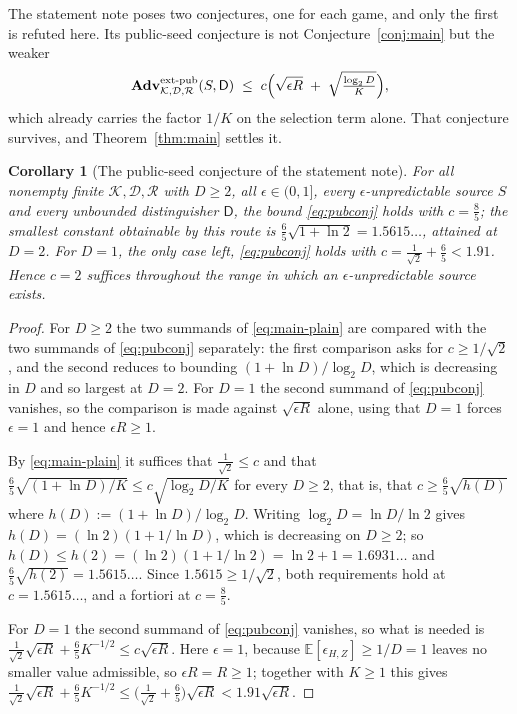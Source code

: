 \documentclass[11pt,a4paper]{article}
\theoremstyle{plain}
\newtheorem{corollary}[theorem]{Corollary}
\theoremstyle{definition}
\theoremstyle{remark}
\newcommand{\Adv}{\mathbf{Adv}}
\newcommand{\extp}{\mathrm{ext}\text{-}\mathrm{pub}}
\newcommand{\calK}{\mathcal{K}}
\newcommand{\calD}{\mathcal{D}}
\newcommand{\calR}{\mathcal{R}}
\begin{document}
The statement note poses two conjectures, one for each game, and only the first is refuted here.
Its public-seed conjecture is not Conjecture~\ref{conj:main} but the weaker
\begin{equation}\label{eq:pubconj}
  \Adv^{\extp}_{\calK,\calD,\calR}(S,\mathsf{D})
  \;\le\; c\Bigl(\sqrt{\epsilon R} \;+\; \sqrt{\tfrac{\log_2 D}{K}}\Bigr) ,
\end{equation}
which already carries the factor $1/K$ on the selection term alone. That conjecture survives, and
Theorem~\ref{thm:main} settles it.

\begin{corollary}[The public-seed conjecture of the statement note]\label{cor:pub}
For all nonempty finite $\calK, \calD, \calR$ with $D \ge 2$, all $\epsilon \in (0,1]$, every
$\epsilon$-unpredictable source $S$ and every unbounded distinguisher $\mathsf{D}$, the bound
\eqref{eq:pubconj} holds with $c = \tfrac85$; the smallest constant obtainable by this route is
$\tfrac65\sqrt{1 + \ln 2} = 1.5615\ldots$, attained at $D = 2$. For $D = 1$, the only case left,
\eqref{eq:pubconj} holds with $c = \tfrac{1}{\sqrt2} + \tfrac65 < 1.91$. Hence $c = 2$ suffices
throughout the range in which an $\epsilon$-unpredictable source exists.
\end{corollary}

\begin{proof}
For $D \ge 2$ the two summands of \eqref{eq:main-plain} are compared with the two summands of
\eqref{eq:pubconj} separately: the first comparison asks for $c \ge 1/\sqrt2$, and the second
reduces to bounding $(1+\ln D)/\log_2 D$, which is decreasing in $D$ and so largest at $D = 2$.
For $D = 1$ the second summand of \eqref{eq:pubconj} vanishes, so the comparison is made against
$\sqrt{\epsilon R}$ alone, using that $D = 1$ forces $\epsilon = 1$ and hence $\epsilon R \ge 1$.

By \eqref{eq:main-plain} it suffices that $\tfrac{1}{\sqrt2} \le c$ and that
$\tfrac65\sqrt{(1+\ln D)/K} \le c\sqrt{\log_2 D / K}$ for every $D \ge 2$, that is, that
$c \ge \tfrac65\sqrt{h(D)}$ where $h(D) := (1+\ln D)/\log_2 D$. Writing
$\log_2 D = \ln D/\ln 2$ gives $h(D) = (\ln 2)(1 + 1/\ln D)$, which is decreasing on $D \ge 2$;
so $h(D) \le h(2) = (\ln 2)(1 + 1/\ln 2) = \ln 2 + 1 = 1.6931\ldots$ and
$\tfrac65\sqrt{h(2)} = 1.5615\ldots$. Since $1.5615 \ge 1/\sqrt2$, both requirements hold at
$c = 1.5615\ldots$, and a fortiori at $c = \tfrac85$.

For $D = 1$ the second summand of \eqref{eq:pubconj} vanishes, so what is needed is
$\tfrac{1}{\sqrt2}\sqrt{\epsilon R} + \tfrac65 K^{-1/2} \le c\sqrt{\epsilon R}$. Here $\epsilon = 1$,
because $\mathbb{E}[\epsilon_{H,Z}] \ge 1/D = 1$ leaves no smaller value admissible, so
$\epsilon R = R \ge 1$; together with $K \ge 1$ this gives
$\tfrac{1}{\sqrt2}\sqrt{\epsilon R} + \tfrac65 K^{-1/2} \le
\bigl(\tfrac{1}{\sqrt2} + \tfrac65\bigr)\sqrt{\epsilon R} < 1.91\sqrt{\epsilon R}$.
\end{proof}
\end{document}
